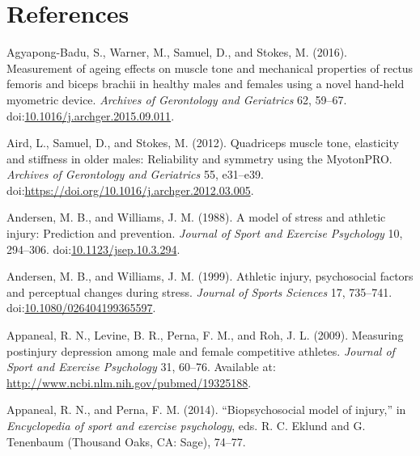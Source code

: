\documentclass[
  english,
  man]{apa6}
\newlength{\cslhangindent}
\newenvironment{cslreferences}%
  {\setlength{\parindent}{0pt}%
  \everypar{\setlength{\hangindent}{\cslhangindent}}\ignorespaces}%
  {\par}
\begin{document}
\hypertarget{references}{%
\section{References}\label{references}}

\begingroup
\setlength{\parindent}{-0.5in}
\setlength{\leftskip}{0.5in}

\hypertarget{refs}{}
\begin{cslreferences}
\leavevmode\hypertarget{ref-Agyapong-Badu2016}{}%
Agyapong-Badu, S., Warner, M., Samuel, D., and Stokes, M. (2016). Measurement of ageing effects on muscle tone and mechanical properties of rectus femoris and biceps brachii in healthy males and females using a novel hand-held myometric device. \emph{Archives of Gerontology and Geriatrics} 62, 59--67. doi:\href{https://doi.org/10.1016/j.archger.2015.09.011}{10.1016/j.archger.2015.09.011}.

\leavevmode\hypertarget{ref-Aird2012}{}%
Aird, L., Samuel, D., and Stokes, M. (2012). Quadriceps muscle tone, elasticity and stiffness in older males: Reliability and symmetry using the MyotonPRO. \emph{Archives of Gerontology and Geriatrics} 55, e31--e39. doi:\href{https://doi.org/https://doi.org/10.1016/j.archger.2012.03.005}{https://doi.org/10.1016/j.archger.2012.03.005}.

\leavevmode\hypertarget{ref-Andersen1988}{}%
Andersen, M. B., and Williams, J. M. (1988). A model of stress and athletic injury: Prediction and prevention. \emph{Journal of Sport and Exercise Psychology} 10, 294--306. doi:\href{https://doi.org/10.1123/jsep.10.3.294}{10.1123/jsep.10.3.294}.

\leavevmode\hypertarget{ref-Andersen1999}{}%
Andersen, M. B., and Williams, J. M. (1999). Athletic injury, psychosocial factors and perceptual changes during stress. \emph{Journal of Sports Sciences} 17, 735--741. doi:\href{https://doi.org/10.1080/026404199365597}{10.1080/026404199365597}.

\leavevmode\hypertarget{ref-Appaneal2009}{}%
Appaneal, R. N., Levine, B. R., Perna, F. M., and Roh, J. L. (2009). Measuring postinjury depression among male and female competitive athletes. \emph{Journal of Sport and Exercise Psychology} 31, 60--76. Available at: \url{http://www.ncbi.nlm.nih.gov/pubmed/19325188}.

\leavevmode\hypertarget{ref-Appaneal2014}{}%
Appaneal, R. N., and Perna, F. M. (2014). ``Biopsychosocial model of injury,'' in \emph{Encyclopedia of sport and exercise psychology}, eds. R. C. Eklund and G. Tenenbaum (Thousand Oaks, CA: Sage), 74--77.


\end{cslreferences}
\end{document}
